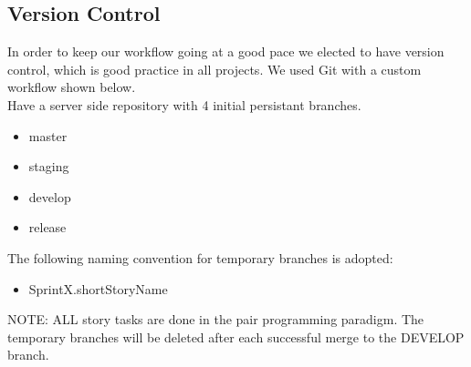\subsection{Version Control}
\label{sec:git}

In order to keep our workflow going at a good pace we elected to have version control, which is good practice in all projects. We used Git with a custom workflow shown below. \\

Have a server side repository with 4 initial persistant branches.
\begin{itemize}
\item master
\item staging
\item develop
\item release
\end{itemize}

The following naming convention for temporary branches is adopted: 

\begin{itemize}
\item SprintX.shortStoryName
\end{itemize}

NOTE: ALL story tasks are done in the pair programming paradigm. The temporary branches will be deleted after each successful merge to the DEVELOP branch.

